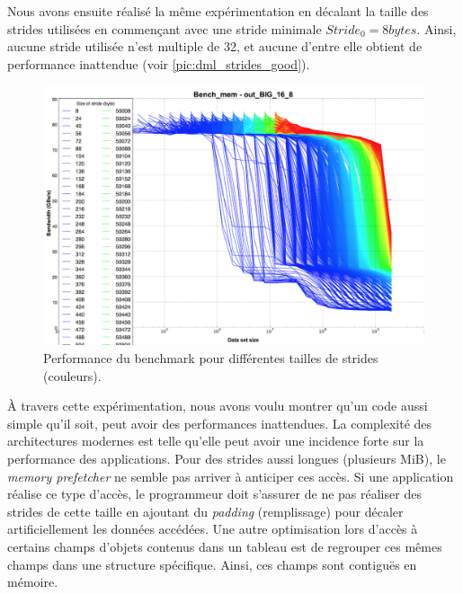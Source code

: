         Nous avons ensuite réalisé la même expérimentation en décalant la taille des strides utilisées en commençant avec une stride minimale $Stride_0 =  8 bytes$. Ainsi, aucune stride utilisée n'est multiple de 32, et aucune d'entre elle obtient de performance inattendue (voir \autoref{pic:dml_strides_good}).
        
        
        \begin{figure}
        \center
        \includegraphics[width=12cm]{images/dml_strides.png}
        \caption{\label{pic:dml_strides_good} Performance du benchmark pour différentes tailles de strides (couleurs).  }
        \end{figure}
        
        À travers cette expérimentation, nous avons voulu montrer qu'un code aussi simple qu'il soit, peut avoir des performances inattendues. La complexité des architectures modernes est telle qu'elle peut avoir une incidence forte sur la performance des applications. Pour des strides aussi longues (plusieurs MiB), le \textit{memory prefetcher} ne semble pas arriver à anticiper ces accès. Si une application réalise ce type d'accès, le programmeur doit s'assurer de ne pas réaliser des strides de cette taille en ajoutant du \textit{padding} (remplissage) pour décaler artificiellement les données accédées. Une autre optimisation lors d'accès à certains champs d'objets contenus dans un tableau est de regrouper ces mêmes champs dans une structure spécifique. Ainsi, ces champs sont contiguës en mémoire. 
        
        
        

